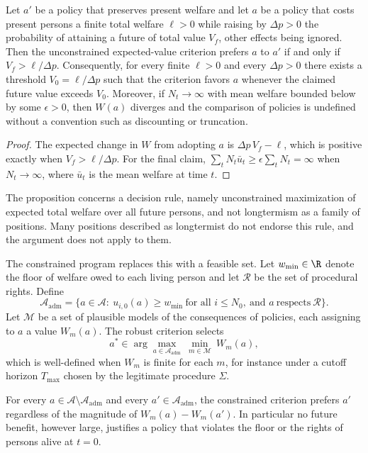 \begin{proposition}
Let $a'$ be a policy that preserves present welfare and let $a$ be a policy that costs present persons a finite total welfare $\ell>0$ while raising by $\Delta p>0$ the probability of attaining a future of total value $V_f$, other effects being ignored. Then the unconstrained expected-value criterion prefers $a$ to $a'$ if and only if $V_f>\ell/\Delta p$. Consequently, for every finite $\ell>0$ and every $\Delta p>0$ there exists a threshold $V_0=\ell/\Delta p$ such that the criterion favors $a$ whenever the claimed future value exceeds $V_0$. Moreover, if $N_t\to\infty$ with mean welfare bounded below by some $\epsilon>0$, then $W(a)$ diverges and the comparison of policies is undefined without a convention such as discounting or truncation.
\end{proposition}

\begin{proof}
The expected change in $W$ from adopting $a$ is $\Delta p\,V_f-\ell$, which is positive exactly when $V_f>\ell/\Delta p$. For the final claim, $\sum_{t}N_t\bar u_t\ge\epsilon\sum_tN_t=\infty$ when $N_t\to\infty$, where $\bar u_t$ is the mean welfare at time $t$.
\end{proof}

The proposition concerns a decision rule, namely unconstrained maximization of expected total welfare over all future persons, and not longtermism as a family of positions. Many positions described as longtermist do not endorse this rule, and the argument does not apply to them.

The constrained program replaces this with a feasible set. Let $w_{\min}\in\R$ denote the floor of welfare owed to each living person and let $\mathcal{R}$ be the set of procedural rights. Define
\[
\mathcal{A}_{\mathrm{adm}}=\Big\{a\in\mathcal{A}:\ u_{i,0}(a)\ge w_{\min}\ \text{for all } i\le N_0,\ \text{and } a\ \text{respects}\ \mathcal{R}\Big\}.
\]
Let $\mathcal{M}$ be a set of plausible models of the consequences of policies, each assigning to $a$ a value $W_m(a)$. The robust criterion selects
\[
a^\ast\in\arg\max_{a\in\mathcal{A}_{\mathrm{adm}}}\ \min_{m\in\mathcal{M}}\ W_m(a),
\]
which is well-defined when $W_m$ is finite for each $m$, for instance under a cutoff horizon $T_{\max}$ chosen by the legitimate procedure $\Sigma$.

\begin{proposition}
For every $a\in\mathcal{A}\setminus\mathcal{A}_{\mathrm{adm}}$ and every $a'\in\mathcal{A}_{\mathrm{adm}}$, the constrained criterion prefers $a'$ regardless of the magnitude of $W_m(a)-W_m(a')$. In particular no future benefit, however large, justifies a policy that violates the floor or the rights of persons alive at $t=0$.
\end{proposition}

